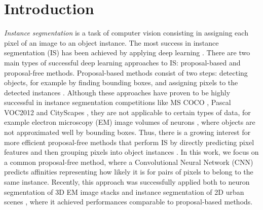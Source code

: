 
\section{Introduction}

\emph{Instance segmentation} is a task of computer vision consisting in assigning each pixel of an image to an object instance. %
The most success in instance segmentation (IS) has been achieved by applying deep learning \cite{he2017mask,romera2016recurrent,liu2018affinity}. There are two main types of successful deep learning approaches to IS: proposal-based and proposal-free methods. Proposal-based methods consist of two steps: detecting objects, for example by finding bounding boxes, and assigning pixels to the detected instances \cite{he2017mask,dai2016instance,li2017fully}. Although these approaches have proven to be highly successful in instance segmentation competitions like MS COCO \cite{lin2014microsoft}, Pascal VOC2012 \cite{everingham2010pascal} and CityScapes \cite{cordts2016cityscapes}, they are not applicable to certain types of data, for example electron microscopy (EM) image volumes of neurons \cite{arganda2015crowdsourcing}, where objects are not approximated well by bounding boxes. 
Thus, there is a growing interest for more efficient proposal-free methods that perform IS by directly predicting pixel features and then grouping pixels into object instances \cite{kong2018recurrent,novotny2018semi,kulikov2018instance,kirillov2017instancecut}. In this work, we focus on a common proposal-free method, where a Convolutional Neural Network (CNN) predicts affinities representing how likely it is for pairs of pixels to belong to the same instance. Recently, this approach was successfully applied both to neuron segmentation of 3D EM image stacks \cite{lee2017superhuman,wolf2018mutex} and instance segmentation of 2D urban scenes \cite{liu2018affinity}, where it achieved performances comparable to proposal-based methods.

